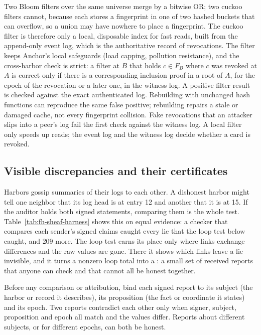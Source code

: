 \documentclass[11pt,a4paper]{article}
\theoremstyle{definition}
\theoremstyle{remark}
\begin{document}
Two Bloom filters over the same universe merge by a bitwise OR; two cuckoo filters cannot, because each stores a fingerprint in one of two hashed buckets that can overflow, so a union may have nowhere to place a fingerprint. The cuckoo filter is therefore only a local, disposable index for fast reads, built from the append-only event log, which is the authoritative record of revocations. The filter keeps Anchor's local safeguards (load capping, pollution resistance), and the cross-harbor check is strict: a filter at $B$ that holds $c \in F_B$ where $c$ was revoked at $A$ is correct only if there is a corresponding inclusion proof in a root of $A$, for the epoch of the revocation or a later one, in the witness log. A positive filter result is checked against the exact authenticated log.
Rebuilding with unchanged hash functions can reproduce the same false positive;
rebuilding repairs a stale or damaged cache, not every fingerprint collision. Fake revocations that an attacker slips into a peer's log fail the first check against the witness log. A local filter only speeds up reads; the event log and the witness log decide whether a card is revoked.

\subsection{Visible discrepancies and their certificates}\label{sec:fh-sheaf}

Harbors gossip summaries of their logs to each other. A dishonest harbor might
tell one neighbor that its log head is at entry 12 and another that it is at
15. If the auditor holds both signed statements, comparing them is the whole
test. Table~\ref{tab:fh-sheaf-harness} shows this on equal evidence: a checker
that compares each sender's signed claims caught every lie that the loop test
below caught, and $209$ more. The loop test earns its place only where links
exchange differences and the raw values are gone. There it shows which links
leave a lie invisible, and it turns a nonzero loop total into a
: a small set of received reports that anyone
can check and that cannot all be honest together.

Before any comparison or attribution, bind each signed report to its subject
(the harbor or record it describes), its proposition (the fact or coordinate it
states) and its epoch. Two reports contradict each other only when signer,
subject, proposition and epoch all match and the values differ. Reports about
different subjects, or for different epochs, can both be honest.
\end{document}
